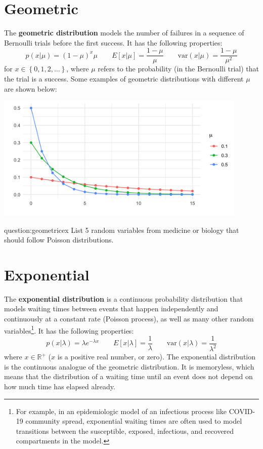 \section{Geometric \label{sect:geometric}}

The \textbf{geometric distribution} models the number of failures in a sequence of Bernoulli trials before the first success. It has the following properties:
$$ p(x|\mu) = (1-\mu)^x \mu \qquad E[x|\mu] = \frac{1-\mu}{\mu} \qquad \text{var}(x|\mu) = \frac{1-\mu}{\mu^2}  $$
for $x \in \left\{0, 1, 2, \dots \right\}$, where $\mu$ refers to the probability (in the Bernoulli trial) that the trial is a success. Some examples of geometric distributions with different $\mu$ are shown below: 
\begin{center}
\includegraphics[width=0.9\textwidth]{img/l01-figure4-geometric-mu-change.png}
\end{center}

\begin{question}{question:geometricex}
List 5 random variables from medicine or biology that should follow Poisson distributions.
\end{question}


\section{Exponential \label{sect:exponential}}

The \textbf{exponential distribution} is a continuous probability distribution that models waiting times between events that happen independently and continuously at a constant rate (Poisson process), as well as many other random variables\footnote{For example, in an epidemiologic model of an infectious process like COVID-19 community spread, exponential waiting times are often used to model transitions between the susceptible, exposed, infectious, and recovered compartments in the model.}. It has the following properties:
$$ p(x|\lambda) = \lambda e^{-\lambda x} \qquad E[x|\lambda] = \frac{1}{\lambda} \qquad \text{var}(x|\lambda) = \frac{1}{\lambda^2} $$
where $x \in \mathbb{R}^+$ ($x$ is a positive real number, or zero). The exponential distribution is the continuous analogue of the geometric distribution. It is memoryless, which means that the distribution of a waiting time until an event does not depend on how much time has elapsed already.

